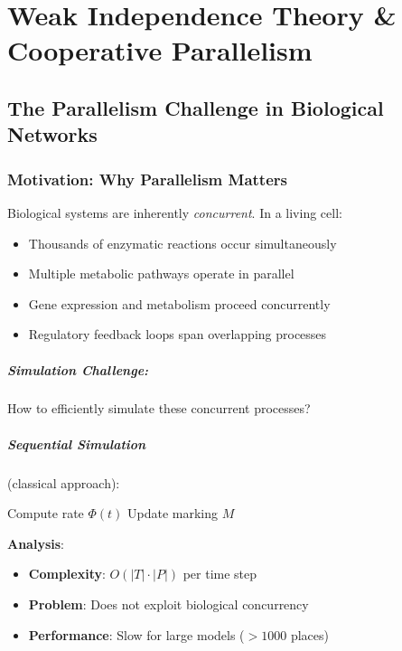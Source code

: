 \chapter{Weak Independence Theory \& Cooperative Parallelism}
\label{ch:weak-independence}

\section{The Parallelism Challenge in Biological Networks}
\label{sec:parallelism-challenge}

\subsection{Motivation: Why Parallelism Matters}
\label{subsec:parallelism-motivation}

Biological systems are inherently \emph{concurrent}. In a living cell:
\begin{itemize}
    \item Thousands of enzymatic reactions occur simultaneously
    \item Multiple metabolic pathways operate in parallel
    \item Gene expression and metabolism proceed concurrently
    \item Regulatory feedback loops span overlapping processes
\end{itemize}

\paragraph{Simulation Challenge:} How to efficiently simulate these concurrent processes?

\paragraph{Sequential Simulation} (classical approach):
\begin{algorithm}[H]
\caption{Sequential simulation}
\begin{algorithmic}[1]
        \State Compute rate $\Phi(t)$
        \State Update marking $M$
    \EndFor
\EndFor
\end{algorithmic}
\end{algorithm}

\noindent\textbf{Analysis}:
\begin{itemize}
    \item \textbf{Complexity}: $O(|T| \cdot |P|)$ per time step
    \item \textbf{Problem}: Does not exploit biological concurrency
    \item \textbf{Performance}: Slow for large models ($>1000$ places)
\end{itemize}

